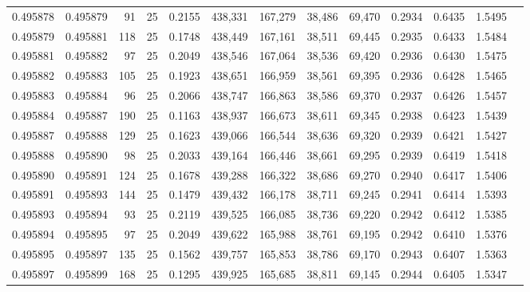 \begin{tabular}{rrrrrrrrrrrrr}
0.495878 & 0.495879 &    91 &  25 &                                     0.2155 & 438,331 & 167,279 &  38,486 &  69,470 & 0.2934 & 0.6435 & 1.5495 \\
0.495879 & 0.495881 &   118 &  25 &                                     0.1748 & 438,449 & 167,161 &  38,511 &  69,445 & 0.2935 & 0.6433 & 1.5484 \\
0.495881 & 0.495882 &    97 &  25 &                                     0.2049 & 438,546 & 167,064 &  38,536 &  69,420 & 0.2936 & 0.6430 & 1.5475 \\
0.495882 & 0.495883 &   105 &  25 &                                     0.1923 & 438,651 & 166,959 &  38,561 &  69,395 & 0.2936 & 0.6428 & 1.5465 \\
0.495883 & 0.495884 &    96 &  25 &                                     0.2066 & 438,747 & 166,863 &  38,586 &  69,370 & 0.2937 & 0.6426 & 1.5457 \\
0.495884 & 0.495887 &   190 &  25 &                                     0.1163 & 438,937 & 166,673 &  38,611 &  69,345 & 0.2938 & 0.6423 & 1.5439 \\
0.495887 & 0.495888 &   129 &  25 &                                     0.1623 & 439,066 & 166,544 &  38,636 &  69,320 & 0.2939 & 0.6421 & 1.5427 \\
0.495888 & 0.495890 &    98 &  25 &                                     0.2033 & 439,164 & 166,446 &  38,661 &  69,295 & 0.2939 & 0.6419 & 1.5418 \\
0.495890 & 0.495891 &   124 &  25 &                                     0.1678 & 439,288 & 166,322 &  38,686 &  69,270 & 0.2940 & 0.6417 & 1.5406 \\
0.495891 & 0.495893 &   144 &  25 &                                     0.1479 & 439,432 & 166,178 &  38,711 &  69,245 & 0.2941 & 0.6414 & 1.5393 \\
0.495893 & 0.495894 &    93 &  25 &                                     0.2119 & 439,525 & 166,085 &  38,736 &  69,220 & 0.2942 & 0.6412 & 1.5385 \\
0.495894 & 0.495895 &    97 &  25 &                                     0.2049 & 439,622 & 165,988 &  38,761 &  69,195 & 0.2942 & 0.6410 & 1.5376 \\
0.495895 & 0.495897 &   135 &  25 &                                     0.1562 & 439,757 & 165,853 &  38,786 &  69,170 & 0.2943 & 0.6407 & 1.5363 \\
0.495897 & 0.495899 &   168 &  25 &                                     0.1295 & 439,925 & 165,685 &  38,811 &  69,145 & 0.2944 & 0.6405 & 1.5347 \\

\end{tabular}
